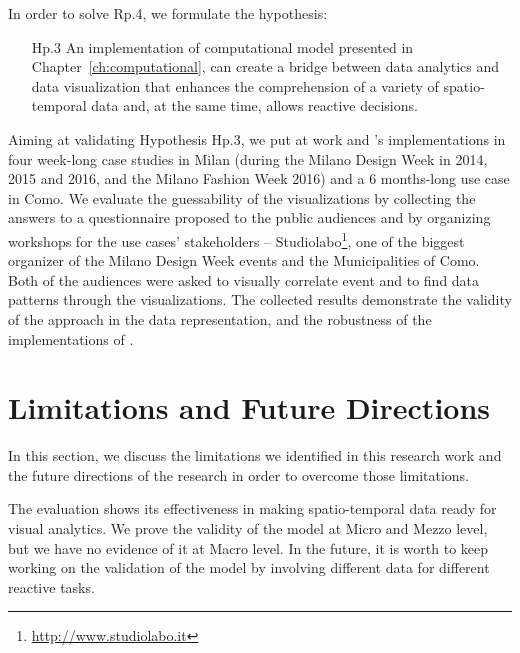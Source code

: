 In order to solve \textsf{Rp.4}, we formulate the hypothesis:
\begin{itemize}[leftmargin=42pt]
\item[\textsf{Hp.3}] An implementation of \river{} computational model presented in Chapter~\ref{ch:computational}, can create a bridge between data analytics and data visualization that enhances the comprehension of a variety of spatio-temporal data and, at the same time, allows reactive decisions.
\end{itemize}

Aiming at validating Hypothesis \textsf{Hp.3}, we put at work \frappe{} and \river{}'s implementations in four week-long case studies in Milan (during the Milano Design Week in 2014, 2015 and 2016, and the Milano Fashion Week 2016) and a 6 months-long use case in Como.
We evaluate the guessability of the visualizations by collecting the answers to a questionnaire proposed to the public audiences and by organizing workshops for the use cases' stakeholders -- Studiolabo\footnote{\url{http://www.studiolabo.it}}, one of the biggest organizer of the Milano Design Week events and the Municipalities of Como.
Both of the audiences were asked to visually correlate event and to find data patterns through the visualizations.
The collected results demonstrate the validity of the \frappe{} approach in the data representation, and the robustness of the implementations of \river{}.

\section{Limitations and Future Directions}
In this section, we discuss the limitations we identified in this research work and the future directions of the research in order to overcome those limitations.

The \frappe{} evaluation shows its effectiveness in making spatio-temporal data ready for visual analytics.
We prove the validity of the model at Micro and Mezzo level, but we have no evidence of it at Macro level.
In the future, it is worth to keep working on the validation of the model by involving different data for different reactive tasks.

